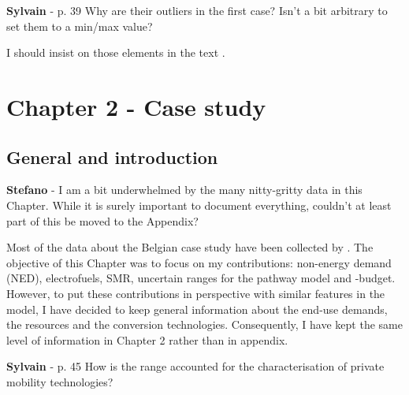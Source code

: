 \documentclass[12pt,a4paper]{article}
\begin{document}
\noindent 

\begin{mdframed}[style=manuscript] %

\end{mdframed}

\begin{mdframed}[style=comment] %
{\color{purple} \textbf{Sylvain}} - p. 39 Why are their outliers in the first case? Isn't a bit arbitrary to set them to a min/max value?
\end{mdframed}

\noindent I should insist on those elements in the text {\color{blue} }.

\begin{mdframed}[style=manuscript] %

\end{mdframed}

\section{Chapter 2 - Case study}
\label{case_study}

\subsection{General and introduction}
\label{methodo_general}

\begin{mdframed}[style=comment] %
{\color{orange} \textbf{Stefano}} - I am a bit underwhelmed by the many nitty-gritty data in this Chapter. While it is surely important to document everything, couldn’t at least part of this be moved to the Appendix?
\end{mdframed}

\noindent Most of the data about the Belgian case study have been collected by \citet{limpens2021generating}. The objective of this Chapter was to focus on my contributions: non-energy demand (NED), electrofuels, SMR, uncertain ranges for the pathway model and -budget. However, to put these contributions in perspective with similar features in the model, I have decided to keep general information about the end-use demands, the resources and the conversion technologies. Consequently, I have kept the same level of information in Chapter 2 rather than in appendix.

\begin{mdframed}[style=comment] %
{\color{purple} \textbf{Sylvain}} - p. 45 How is the range accounted for the characterisation of private mobility technologies?
\end{mdframed}
\end{document}
